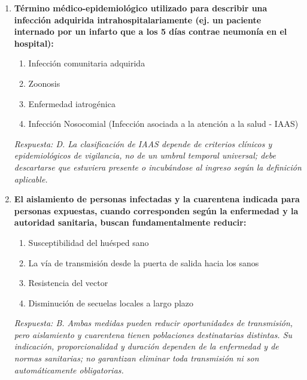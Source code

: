 \begin{enumerate}[label=\textbf{\arabic*.}]
    \item \textbf{Término médico-epidemiológico utilizado para describir una infección adquirida intrahospitalariamente (ej. un paciente internado por un infarto que a los 5 días contrae neumonía en el hospital):}
    \begin{enumerate}
        \item[A)] Infección comunitaria adquirida
        \item[B)] Zoonosis
        \item[C)] Enfermedad iatrogénica
        \item[D)] Infección Nosocomial (Infección asociada a la atención a la salud - IAAS)
    \end{enumerate}
    \textit{Respuesta: D. La clasificación de IAAS depende de criterios clínicos y epidemiológicos de vigilancia, no de un umbral temporal universal; debe descartarse que estuviera presente o incubándose al ingreso según la definición aplicable.}

    \item \textbf{El aislamiento de personas infectadas y la cuarentena indicada para personas expuestas, cuando corresponden según la enfermedad y la autoridad sanitaria, buscan fundamentalmente reducir:}
    \begin{enumerate}
        \item[A)] Susceptibilidad del huésped sano
        \item[B)] La vía de transmisión desde la puerta de salida hacia los sanos
        \item[C)] Resistencia del vector
        \item[D)] Disminución de secuelas locales a largo plazo
    \end{enumerate}
    \textit{Respuesta: B. Ambas medidas pueden reducir oportunidades de transmisión, pero aislamiento y cuarentena tienen poblaciones destinatarias distintas. Su indicación, proporcionalidad y duración dependen de la enfermedad y de normas sanitarias; no garantizan eliminar toda transmisión ni son automáticamente obligatorias.}

\end{enumerate}

